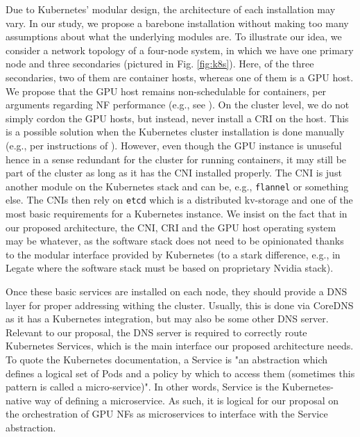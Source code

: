 \documentclass{IEEEtran}
\begin{document}
Due to Kubernetes' modular design, the architecture of each installation may vary. In our study, we propose a barebone installation without making too many assumptions about what the underlying modules are. To illustrate our idea, we consider a network topology of a four-node system, in which we have one primary node and three secondaries (pictured in Fig. \ref{fig:k8s}). Here, of the three secondaries, two of them are container hosts, whereas one of them is a GPU host. We propose that the GPU host remains non-schedulable for containers, per arguments regarding NF performance (e.g., see \cite{panda2016netbricks}). On the cluster level, we do not simply cordon the GPU hosts, but instead, never install a \gls{CRI} on the host. This is a possible solution when the Kubernetes cluster installation is done manually (e.g., per instructions of \cite{kelsey}). However, even though the GPU instance is unuseful hence in a sense redundant for the cluster for running containers, it may still be part of the cluster as long as it has the \gls{CNI} installed properly. The CNI is just another module on the Kubernetes stack and can be, e.g., \verb|flannel| or something else. The CNIs then rely on \verb|etcd| which is a distributed kv-storage and one of the most basic requirements for a Kubernetes instance. We insist on the fact that in our proposed architecture, the CNI, CRI and the GPU host operating system may be whatever, as the software stack does not need to be opinionated thanks to the modular interface provided by Kubernetes (to a stark difference, e.g., in Legate \cite{bauer2019legate} where the software stack must be based on proprietary Nvidia stack).

Once these basic services are installed on each node, they should provide a DNS layer for proper addressing withing the cluster. Usually, this is done via CoreDNS as it has a Kubernetes integration, but may also be some other DNS server. Relevant to our proposal, the DNS server is required to correctly route Kubernetes Services, which is the main interface our proposed architecture needs. To quote the Kubernetes documentation, a Service is "an abstraction which defines a logical set of Pods and a policy by which to access them (sometimes this pattern is called a micro-service)". In other words, Service is the Kubernetes-native way of defining a microservice. As such, it is logical for our proposal on the orchestration of GPU NFs as microservices to interface with the Service abstraction.
\end{document}
